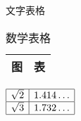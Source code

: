 \documentclass[nofonts]{ctexart}
\begin{document}
\begin{table}
	\parbox[b]{.5\textwidth}{\centering
		\caption{文字表格}
		\begin{tabular}{|c|c|}
			\hline
			图	& 表	\\ \hline 
		\end{tabular}
	}%
	\parbox[b]{.5\textwidth}{\centering
		\caption{数学表格}
		$ \begin{array}{|c|c|}
			\hline \sqrt{2}	& 1.414\dots	\\ \hline
			\sqrt{3}		& 1.732\dots	\\ \hline
		\end{array} $}
\end{table}
\end{document}
